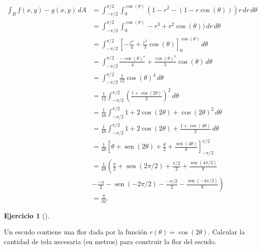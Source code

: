\documentclass[
  spanish,
  a4paper,
]{scrreport}
\theoremstyle{definition}
\newtheorem{exercise}{Ejercicio}[chapter]
\theoremstyle{remark}
\begin{document}
\begin{tcolorbox}
\begin{align*}
\int_{R} f(x,y)-g(x,y)\,dA
&= \int_{-\pi/2}^{\pi/2} \int_0^{\cos(\theta)} (1-r^2 - (1-r\cos(\theta)))r\,dr\,d\theta \\
&= \int_{-\pi/2}^{\pi/2} \int_0^{\cos(\theta)} -r^3+r^2\cos(\theta))\,dr\,d\theta \\
&= \int_{-\pi/2}^{\pi/2} \left[-\frac{r^4}{4}+\frac{r^3}{3}\cos(\theta)\right]_0^{\cos(\theta)} \,d\theta \\
&= \int_{-\pi/2}^{\pi/2} \frac{-\cos(\theta)^4}{4}+\frac{\cos(\theta)^3}{3}\cos(\theta) \,d\theta \\
&= \int_{-\pi/2}^{\pi/2} \frac{1}{12}\cos(\theta)^4 \,d\theta \\
&= \frac{1}{12}\int_{-\pi/2}^{\pi/2} \left(\frac{1+\cos(2\theta)}{2}\right)^2 \,d\theta \\
&= \frac{1}{48}\int_{-\pi/2}^{\pi/2} 1+2\cos(2\theta)+\cos(2\theta)^2\,d\theta \\
&= \frac{1}{48}\int_{-\pi/2}^{\pi/2} 1+2\cos(2\theta)+\frac{1+\cos(4\theta)}{2}\,d\theta \\
&= \frac{1}{48}\left[\theta+\operatorname{sen}(2\theta)+\frac{\theta}{2}+\frac{\operatorname{sen}(4\theta)}{8}\right]_{-\pi/2}^{\pi/2} \\
&= \frac{1}{48}\left(\frac{\pi}{2}+\operatorname{sen}(2\pi/2)+\frac{\pi/2}{2}+\frac{\operatorname{sen}(4\pi/2)}{8}\right. \\
&\left.- \frac{-\pi}{2} - \operatorname{sen}(-2\pi/2)-\frac{-\pi/2}{2}-\frac{\operatorname{sen}(-4\pi/2)}{8}\right) \\
&= \frac{\pi}{32}.
\end{align*}

\end{tcolorbox}

\begin{exercise}[]\protect\hypertarget{exr-integral-polar-petalo}{}\label{exr-integral-polar-petalo}

Un escudo contiene una flor dada por la función
\(r(\theta) = \cos(2\theta)\). Calcular la cantidad de tela necesaria
(en metros) para construir la flor del escudo.

\end{exercise}
\end{document}
